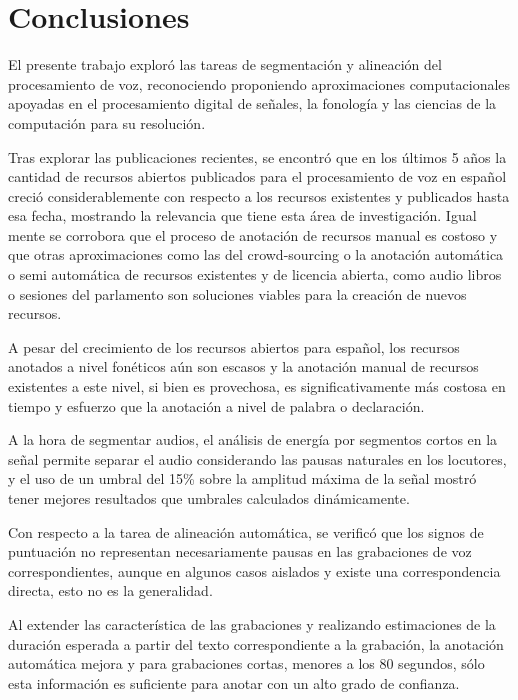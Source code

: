 \chapter{Conclusiones}

El presente trabajo exploró las tareas de segmentación y alineación del procesamiento de voz, reconociendo proponiendo aproximaciones computacionales apoyadas en el procesamiento digital de señales, la fonología y las ciencias de la computación para su resolución.

Tras explorar las publicaciones recientes, se encontró que en los últimos 5 años la cantidad de recursos abiertos publicados para el procesamiento de voz en español creció considerablemente con respecto a los recursos existentes y publicados hasta esa fecha, mostrando la relevancia que tiene esta área de investigación. Igual mente se corrobora que el proceso de anotación de recursos manual es costoso y que otras aproximaciones como las del crowd-sourcing o la anotación automática o semi automática de recursos existentes y de licencia abierta, como audio libros o sesiones del parlamento son soluciones viables para la creación de nuevos recursos.

A pesar del crecimiento de los recursos abiertos para español, los recursos anotados a nivel fonéticos aún son escasos y la anotación manual de recursos existentes a este nivel, si bien es provechosa, es significativamente m\'as costosa en tiempo y esfuerzo que la anotación a nivel de palabra o declaración.

A la hora de segmentar audios, el análisis de energía por segmentos cortos en la señal permite separar el audio considerando las pausas naturales en los locutores, y el uso de un umbral del 15\% sobre la amplitud máxima de la señal mostró tener mejores resultados que umbrales calculados dinámicamente.

Con respecto a la tarea de alineación automática, se verificó que los signos de puntuación no representan necesariamente pausas en las grabaciones de voz correspondientes, aunque en algunos casos aislados y existe una correspondencia directa, esto no es la generalidad. 

Al extender las característica de las grabaciones y realizando estimaciones de la duración esperada a partir del texto correspondiente a la grabación, la anotación automática mejora y para grabaciones cortas, menores a los 80 segundos, s\'olo esta información es suficiente para anotar con un alto grado de confianza.

